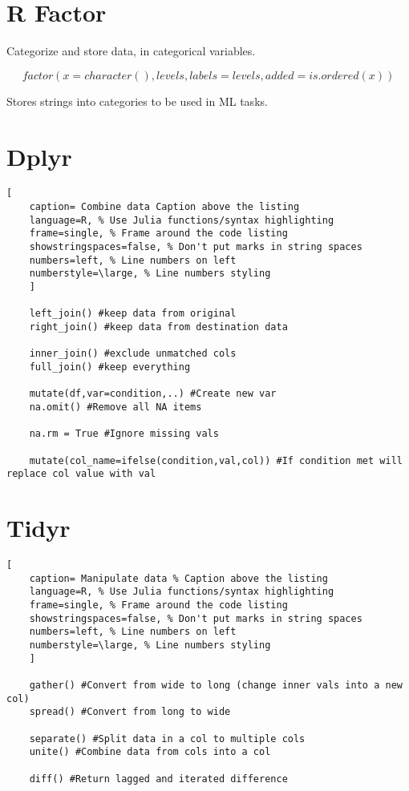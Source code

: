\documentclass[11pt]{scrartcl} %
\begin{document}
\section{R Factor}

Categorize and store data, in categorical variables.

\[ factor(x=character(),levels,labels=levels,added=is.ordered(x))\]

Stores strings into categories to be used in ML tasks.

\section{Dplyr}

\begin{lstlisting}[
	caption= Combine data Caption above the listing
	language=R, % Use Julia functions/syntax highlighting
	frame=single, % Frame around the code listing
	showstringspaces=false, % Don't put marks in string spaces
	numbers=left, % Line numbers on left
	numberstyle=\large, % Line numbers styling
	]

	left_join() #keep data from original
	right_join() #keep data from destination data

	inner_join() #exclude unmatched cols
	full_join() #keep everything

	mutate(df,var=condition,..) #Create new var 
	na.omit() #Remove all NA items

	na.rm = True #Ignore missing vals

	mutate(col_name=ifelse(condition,val,col)) #If condition met will replace col value with val

\end{lstlisting}

\section{Tidyr}

\begin{lstlisting}[
	caption= Manipulate data % Caption above the listing
	language=R, % Use Julia functions/syntax highlighting
	frame=single, % Frame around the code listing
	showstringspaces=false, % Don't put marks in string spaces
	numbers=left, % Line numbers on left
	numberstyle=\large, % Line numbers styling
	]

	gather() #Convert from wide to long (change inner vals into a new col)
	spread() #Convert from long to wide 
	
	separate() #Split data in a col to multiple cols
	unite() #Combine data from cols into a col

	diff() #Return lagged and iterated difference

\end{lstlisting}
\end{document}

